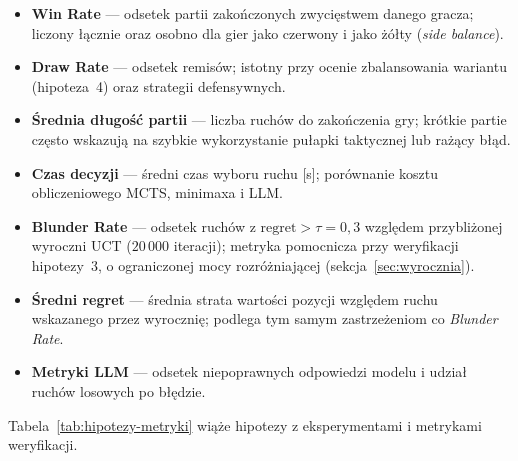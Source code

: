 \documentclass[11pt, a4paper]{article}
\begin{document}
\begin{itemize}
    \item \textbf{Win Rate} --- odsetek partii zakończonych zwycięstwem danego gracza; liczony łącznie oraz osobno dla gier jako czerwony i jako żółty (\textit{side balance}).

    \item \textbf{Draw Rate} --- odsetek remisów; istotny przy ocenie zbalansowania wariantu (hipoteza~4) oraz strategii defensywnych.

    \item \textbf{Średnia długość partii} --- liczba ruchów do zakończenia gry; krótkie partie często wskazują na szybkie wykorzystanie pułapki taktycznej lub rażący błąd.

    \item \textbf{Czas decyzji} --- średni czas wyboru ruchu [s]; porównanie kosztu obliczeniowego MCTS, minimaxa i LLM.

    \item \textbf{Blunder Rate} --- odsetek ruchów z $\mathrm{regret} > \tau = 0{,}3$ względem przybliżonej wyroczni UCT ($20\,000$ iteracji); metryka pomocnicza przy weryfikacji hipotezy~3, o ograniczonej mocy rozróżniającej (sekcja~\ref{sec:wyrocznia}).

    \item \textbf{Średni regret} --- średnia strata wartości pozycji względem ruchu wskazanego przez wyrocznię; podlega tym samym zastrzeżeniom co \textit{Blunder Rate}.

    \item \textbf{Metryki LLM} --- odsetek niepoprawnych odpowiedzi modelu i udział ruchów losowych po błędzie.
\end{itemize}

\noindent
Tabela~\ref{tab:hipotezy-metryki} wiąże hipotezy z eksperymentami i metrykami weryfikacji.
\end{document}
